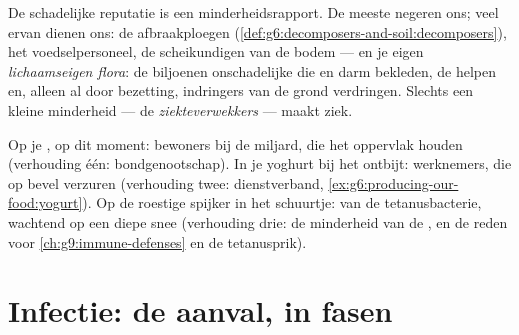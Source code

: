 \begin{proposition}\label{prop:g9:microbes-and-infection:mostly}
De schadelijke reputatie is een minderheidsrapport. De meeste
 negeren ons; veel ervan dienen ons: de afbraakploegen
(\cref{def:g6:decomposers-and-soil:decomposers}), het
voedselpersoneel, de scheikundigen van de bodem --- en je eigen
\emph{lichaamseigen flora}: de biljoenen
onschadelijke  die  en darm bekleden, de 
helpen en, alleen al door bezetting, indringers van de grond
verdringen. Slechts een kleine minderheid --- de
\emph{ziekteverwekkers} --- maakt ziek.
\end{proposition}
\admitted

\begin{example}\label{ex:g9:microbes-and-infection:relations}
Op je , op dit moment: bewoners bij de miljard, die het
oppervlak houden (verhouding één: bondgenootschap). In je yoghurt
bij het ontbijt: werknemers, die op bevel verzuren (verhouding
twee: dienstverband,
\cref{ex:g6:producing-our-food:yogurt}). Op de roestige spijker in
het schuurtje:  van de tetanusbacterie, wachtend op een diepe
snee (verhouding drie: de minderheid van de , en de
reden voor \cref{ch:g9:immune-defenses} en de tetanusprik).
\end{example}

\section{Infectie: de aanval, in fasen}

